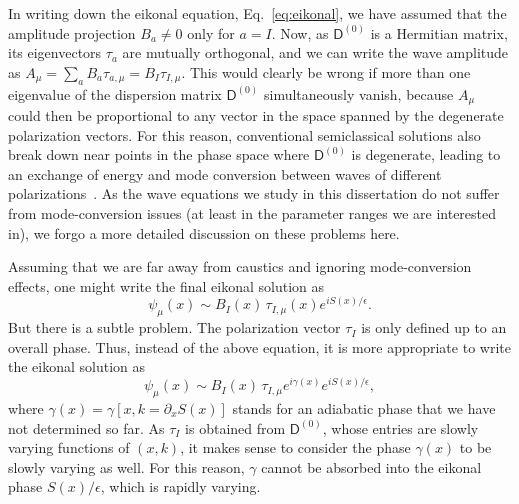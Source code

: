 In writing down the eikonal equation, Eq.~\eqref{eq:eikonal}, we have assumed that the amplitude projection $B_{a} \neq 0$ only for $a = I$.
Now, as $\mathsf{D}^{(0)}$ is a Hermitian matrix, its eigenvectors $\tau_{a}$ are mutually orthogonal, and we can write the wave amplitude as $A_{\mu} = \sum_{a} B_{a} \tau_{a,\mu} = B_{I}\tau_{I,\mu}$.
This would clearly be wrong if more than one eigenvalue of the dispersion matrix $\mathsf{D}^{(0)}$ simultaneously vanish, because $A_{\mu}$ could then be proportional to any vector in the space spanned by the degenerate polarization vectors.
For this reason, conventional semiclassical solutions also break down near points in the phase space where $\mathsf{D}^{(0)}$ is degenerate, leading to an exchange of energy and mode conversion between waves of different polarizations~\cite{tracy2014}.
As the wave equations we study in this dissertation do not suffer from mode-conversion issues (at least in the parameter ranges we are interested in), we forgo a more detailed discussion on these problems here.

Assuming that we are far away from caustics and ignoring mode-conversion effects, one might write the final eikonal solution as
%
\begin{equation}
  \psi_{\mu}(x) \sim B_{I}(x)\,\tau_{I,\mu}(x)e^{iS(x)/\epsilon}.
  \label{eq:psi_wkb_wrong}
\end{equation}
%
But there is a subtle problem.
The polarization vector $\tau_{I}$ is only defined up to an overall phase.
Thus, instead of the above equation, it is more appropriate to write the eikonal solution as
%
\begin{equation}
  \psi_{\mu}(x) \sim B_{I}(x)\,\tau_{I,\mu}e^{i\gamma(x)}e^{iS(x)/\epsilon},
\end{equation}
%
where $\gamma(x) = \gamma[x, k=\partial_{x}S(x)]$ stands for an adiabatic phase that we have not determined so far.
As $\tau_{I}$ is obtained from $\mathsf{D}^{(0)}$, whose entries are slowly varying functions of $(x, k)$, it makes sense to consider the phase $\gamma(x)$ to be slowly varying as well.
For this reason, $\gamma$ cannot be absorbed into the eikonal phase $S(x)/\epsilon$, which is rapidly varying.

